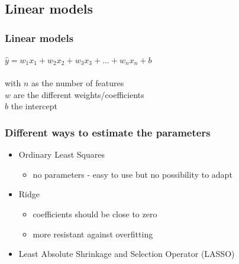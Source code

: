 \documentclass[aspectratio=169]{beamer}
\begin{document}
\subsection{Linear models}

\setcounter{tocdepth}{2}
\begin{frame}{}
   \tableofcontents[currentsubsection]
\end{frame}


\begin{frame}
  \frametitle{Linear models}
  \begin{block}{}
    \begin{center}
      $\hat{y} = w_{1}x_{1} + w_{2}x_{2} + w_{3}x_{3} + ... + w_{n}x_{n} + b$\\
      \ \\
      with $n$ as the  number of features\\
      $w$ are the different weights/coefficients\\
      $b$ the intercept\\
    \end{center}
  \end{block}  
\end{frame}

\begin{frame}
  \frametitle{Different ways to estimate the parameters}
  \begin{block}{}
    \begin{center}
      \begin{itemize}
      \item Ordinary Least Squares
        \begin{itemize}
        \item no parameters - easy to use but no possibility to adapt
        \end{itemize}
      \item Ridge
        \begin{itemize}
        \item coefficients should be close to zero
        \item more resistant against overfitting
        \end{itemize}    
      \item Least Absolute Shrinkage and Selection Operator (LASSO)
      \end{itemize}
    \end{center}
  \end{block}
\end{frame}
\end{document}
